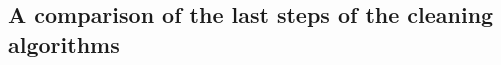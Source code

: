 \begin{table}
    \centering
    \caption{The metrics used for this works analysis as well as their calculation. Right: Confusion
    matrix for a binary (positive/negative) classification.}%
    \label{tab:metrics}
    \begin{subtable}{0.48\textwidth}
        \centering
    \end{subtable}%
    \begin{subtable}{0.48\textwidth}
        \centering
    \end{subtable}%
\end{table}

\subsection{A comparison of the last steps of the cleaning algorithms}%
\label{ap:comparing_last_steps}

